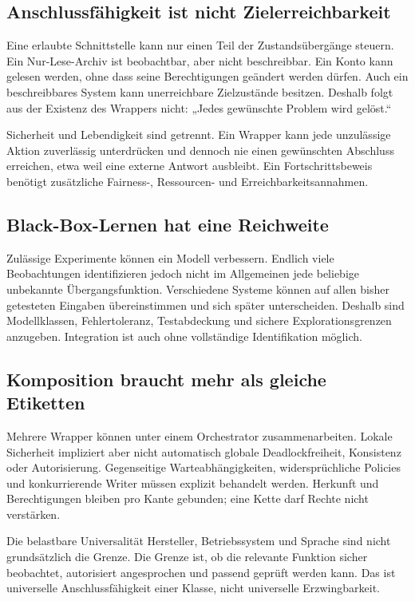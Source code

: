 \begin{cols}
\subsection*{Anschlussfähigkeit ist nicht Zielerreichbarkeit}
Eine erlaubte Schnittstelle kann nur einen Teil der Zustandsübergänge steuern. Ein Nur-Lese-Archiv ist beobachtbar, aber nicht beschreibbar. Ein Konto kann gelesen werden, ohne dass seine Berechtigungen geändert werden dürfen. Auch ein beschreibbares System kann unerreichbare Zielzustände besitzen. Deshalb folgt aus der Existenz des Wrappers nicht: „Jedes gewünschte Problem wird gelöst.“

Sicherheit und Lebendigkeit sind getrennt. Ein Wrapper kann jede unzulässige Aktion zuverlässig unterdrücken und dennoch nie einen gewünschten Abschluss erreichen, etwa weil eine externe Antwort ausbleibt. Ein Fortschrittsbeweis benötigt zusätzliche Fairness-, Ressourcen- und Erreichbarkeitsannahmen.

\subsection*{Black-Box-Lernen hat eine Reichweite}
Zulässige Experimente können ein Modell verbessern. Endlich viele Beobachtungen identifizieren jedoch nicht im Allgemeinen jede beliebige unbekannte Übergangsfunktion. Verschiedene Systeme können auf allen bisher getesteten Eingaben übereinstimmen und sich später unterscheiden. Deshalb sind Modellklassen, Fehlertoleranz, Testabdeckung und sichere Explorationsgrenzen anzugeben. Integration ist auch ohne vollständige Identifikation möglich.

\subsection*{Komposition braucht mehr als gleiche Etiketten}
Mehrere Wrapper können unter einem Orchestrator zusammenarbeiten. Lokale Sicherheit impliziert aber nicht automatisch globale Deadlockfreiheit, Konsistenz oder Autorisierung. Gegenseitige Warteabhängigkeiten, widersprüchliche Policies und konkurrierende Writer müssen explizit behandelt werden. Herkunft und Berechtigungen bleiben pro Kante gebunden; eine Kette darf Rechte nicht verstärken.

\begin{boundary}{Die belastbare Universalität}
Hersteller, Betriebssystem und Sprache sind nicht grundsätzlich die Grenze. Die Grenze ist, ob die relevante Funktion sicher beobachtet, autorisiert angesprochen und passend geprüft werden kann. Das ist universelle Anschlussfähigkeit einer Klasse, nicht universelle Erzwingbarkeit.
\end{boundary}


\end{cols}
